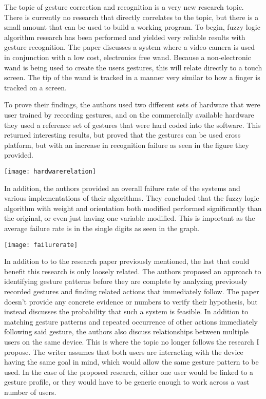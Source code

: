 \documentclass[11pt]{article}
\begin{document}
The topic of gesture correction and recognition is a very new research topic. There is currently no research that directly correlates to the topic, but there is a small amount that can be used to build a working program. To begin, fuzzy logic algorithm research has been performed and yielded very reliable results with gesture recognition\cite{Anderson:2004:VFL:1067343.1067382}. The paper discusses a system where a video camera is used in conjunction with a low cost, electronics free wand\cite{Anderson:2004:VFL:1067343.1067382}. Because a non-electronic wand is being used to create the users gestures, this will relate directly to a touch screen. The tip of the wand is tracked in a manner very similar to how a finger is tracked on a screen.

To prove their findings, the authors used two different sets of hardware that were user trained by recording gestures, and on the commercially available hardware they used a reference set of gestures that were hard coded into the software. This returned interesting results, but proved that the gestures can be used cross platform, but with an increase in recognition failure as seen in the figure they provided.

\begin{center}
\texttt{[image: hardwarerelation]}
\end{center}

In addition, the authors provided an overall failure rate of the systems and various implementations of their algorithms. They concluded that the fuzzy logic algorithm with weight and orientation both modified performed significantly than the original, or even just having one variable modified. This is important as the average failure rate is in the single digits as seen in the graph.

\begin{center}
\texttt{[image: failurerate]}
\end{center}

In addition to to the research paper previously mentioned, the last that could benefit this research is only loosely related. The authors proposed an approach to identifying gesture patterns before they are complete by analyzing previously recorded gestures and finding related actions that immediately follow. \cite{Shimada:2010:ERB:1939751.1939810} The paper doesn't provide any concrete evidence or numbers to verify their hypothesis, but instead discusses the probability that such a system is feasible. In addition to matching gesture patterns and repeated occurrence of other actions immediately following said gesture, the authors also discuss relationships between multiple users on the same device. This is where the topic no longer follows the research I propose. The writer assumes that both users are interacting with the device having the same goal in mind, which would allow the same gesture pattern to be used. In the case of the proposed research, either one user would be linked to a gesture profile, or they would have to be generic enough to work across a vast number of users.
\end{document}
